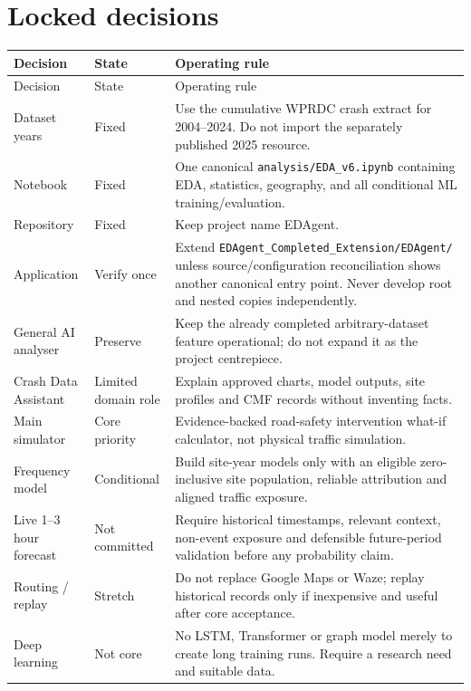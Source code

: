 \documentclass[11pt,a4paper,openany]{report}
\newcommand{\pathcode}[1]{\nolinkurl{#1}}
\begin{document}
\section{Locked decisions}
\small
\begin{longtable}{@{}L{35mm}L{18mm}L{91mm}@{}}
\toprule Decision & State & Operating rule\\\midrule\endfirsthead
\toprule Decision & State & Operating rule\\\midrule\endhead
Dataset years & Fixed & Use the cumulative WPRDC crash extract for 2004--2024. Do not import the separately published 2025 resource.\\
Notebook & Fixed & One canonical \pathcode{analysis/EDA_v6.ipynb} containing EDA, statistics, geography, and all conditional ML training/evaluation.\\
Repository & Fixed & Keep project name EDAgent.\\
Application & Verify once & Extend \pathcode{EDAgent_Completed_Extension/EDAgent/} unless source/configuration reconciliation shows another canonical entry point. Never develop root and nested copies independently.\\
General AI analyser & Preserve & Keep the already completed arbitrary-dataset feature operational; do not expand it as the project centrepiece.\\
Crash Data Assistant & Limited domain role & Explain approved charts, model outputs, site profiles and CMF records without inventing facts.\\
Main simulator & Core priority & Evidence-backed road-safety intervention what-if calculator, not physical traffic simulation.\\
Frequency model & Conditional & Build site-year models only with an eligible zero-inclusive site population, reliable attribution and aligned traffic exposure.\\
Live 1--3 hour forecast & Not committed & Require historical timestamps, relevant context, non-event exposure and defensible future-period validation before any probability claim.\\
Routing / replay & Stretch & Do not replace Google Maps or Waze; replay historical records only if inexpensive and useful after core acceptance.\\
Deep learning & Not core & No LSTM, Transformer or graph model merely to create long training runs. Require a research need and suitable data.\\
\bottomrule
\end{longtable}
\normalsize
\end{document}
